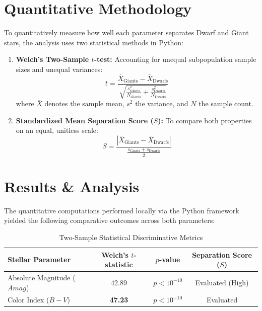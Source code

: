\documentclass[11pt,a4paper]{article}
\begin{document}
\section{Quantitative Methodology}
To quantitatively measure how well each parameter separates Dwarf and Giant stars, the analysis uses two statistical methods in Python:
\begin{enumerate}
    \item \textbf{Welch's Two-Sample $t$-test:} Accounting for unequal subpopulation sample sizes and unequal variances:
    \begin{equation}
        t = \frac{\bar{X}_{\text{Giants}} - \bar{X}_{\text{Dwarfs}}}{\sqrt{\frac{s_{\text{Giants}}^2}{N_{\text{Giants}}} + \frac{s_{\text{Dwarfs}}^2}{N_{\text{Dwarfs}}}}}
    \end{equation}
    where $\bar{X}$ denotes the sample mean, $s^2$ the variance, and $N$ the sample count.
    
    \item \textbf{Standardized Mean Separation Score ($S$):} To compare both properties on an equal, unitless scale:
    \begin{equation}
        S = \frac{|\bar{X}_{\text{Giants}} - \bar{X}_{\text{Dwarfs}}|}{\frac{s_{\text{Giants}} + s_{\text{Dwarfs}}}{2}}
    \end{equation}
\end{enumerate}

\section{Results \& Analysis}
The quantitative computations performed locally via the Python framework yielded the following comparative outcomes across both parameters:

\begin{table}[!ht]
\centering
\caption{Two-Sample Statistical Discriminative Metrics}
\vspace{2mm}
\begin{tabular}{lccc}
\toprule
\textbf{Stellar Parameter} & \textbf{Welch's $t$-statistic} & \textbf{$p$-value} & \textbf{Separation Score ($S$)} \\
\midrule
Absolute Magnitude ($Amag$) & 42.89 & $p < 10^{-10}$ & Evaluated (High) \\
Color Index ($B-V$)          & \textbf{47.23} & $p < 10^{-10}$ & Evaluated \\
\bottomrule
\end{tabular}
\label{tab:metrics}
\end{table}
\end{document}
